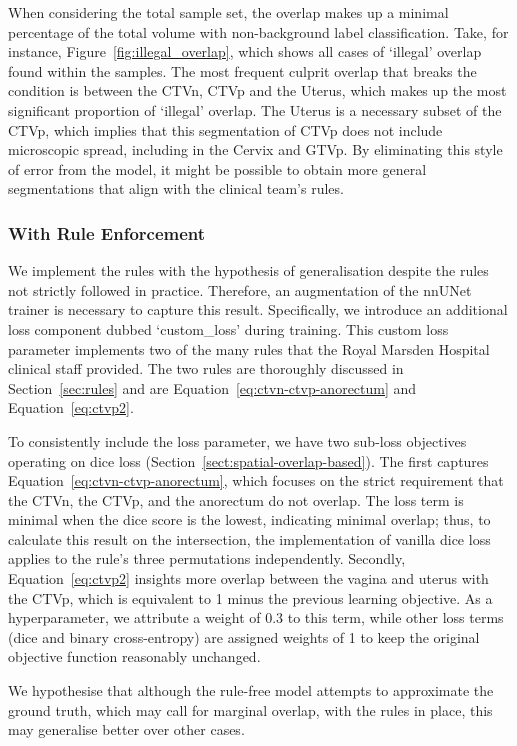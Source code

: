 \documentclass[12pt,twoside]{report}
\begin{document}
When considering the total sample set, the overlap makes up a minimal percentage of the total volume with non-background label classification. Take, for instance, Figure~\ref{fig:illegal_overlap}, which shows all cases of `illegal' overlap found within the samples. The most frequent culprit overlap that breaks the condition is between the CTVn, CTVp and the Uterus, which makes up the most significant proportion of `illegal' overlap. The Uterus is a necessary subset of the CTVp, which implies that this segmentation of CTVp does not include microscopic spread, including in the Cervix and GTVp. By eliminating this style of error from the model, it might be possible to obtain more general segmentations that align with the clinical team's rules.

\subsubsection{With Rule Enforcement}

We implement the rules with the hypothesis of generalisation despite the rules not strictly followed in practice. Therefore, an augmentation of the nnUNet trainer is necessary to capture this result. Specifically, we introduce an additional loss component dubbed `custom\_loss' during training. This custom loss parameter implements two of the many rules that the Royal Marsden Hospital clinical staff provided. The two rules are thoroughly discussed in Section~\ref{sec:rules} and are Equation~\ref{eq:ctvn-ctvp-anorectum} and Equation~\ref{eq:ctvp2}. 

To consistently include the loss parameter, we have two sub-loss objectives operating on dice loss (Section~\ref{sect:spatial-overlap-based}). The first captures Equation~\ref{eq:ctvn-ctvp-anorectum}, which focuses on the strict requirement that the CTVn, the CTVp, and the anorectum do not overlap. The loss term is minimal when the dice score is the lowest, indicating minimal overlap; thus, to calculate this result on the intersection, the implementation of vanilla dice loss applies to the rule's three permutations independently. Secondly, Equation~\ref{eq:ctvp2} insights more overlap between the vagina and uterus with the CTVp, which is equivalent to 1 minus the previous learning objective. As a hyperparameter, we attribute a weight of 0.3 to this term, while other loss terms (dice and binary cross-entropy) are assigned weights of 1 to keep the original objective function reasonably unchanged.

We hypothesise that although the rule-free model attempts to approximate the ground truth, which may call for marginal overlap, with the rules in place, this may generalise better over other cases.
\end{document}
